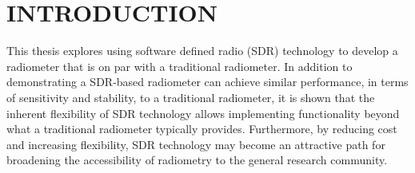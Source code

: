 \chapter{INTRODUCTION}\label{ch:intro}




This thesis explores using software defined radio (SDR) technology to develop a radiometer that is on par with a traditional radiometer.  In addition to demonstrating a SDR-based radiometer can achieve similar performance, in terms of sensitivity and stability, to a traditional radiometer, it is shown that the inherent flexibility of SDR technology allows implementing functionality beyond what a traditional radiometer typically provides.  Furthermore, by reducing cost and increasing flexibility, SDR technology may become an attractive path for broadening the accessibility of radiometry to the general research community.


